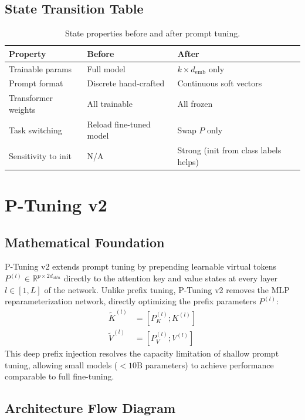 \subsection{State Transition Table}
\begin{table}[h]\centering
\begin{tabular}{lll}\toprule
\textbf{Property} & \textbf{Before} & \textbf{After}\\\midrule
Trainable params & Full model & $k \times d_{\text{emb}}$ only\\
Prompt format & Discrete hand-crafted & Continuous soft vectors\\
Transformer weights & All trainable & All frozen\\
Task switching & Reload fine-tuned model & Swap $P$ only\\
Sensitivity to init & N/A & Strong (init from class labels helps)\\\bottomrule
\end{tabular}
\caption{State properties before and after prompt tuning.}
\end{table}

\newpage
\section{P-Tuning v2}

\subsection{Mathematical Foundation}
P-Tuning v2 extends prompt tuning by prepending learnable virtual tokens $P^{(l)} \in \mathbb{R}^{p \times 2 d_{attn}}$ directly to the attention key and value states at every layer $l \in [1, L]$ of the network. Unlike prefix tuning, P-Tuning v2 removes the MLP reparameterization network, directly optimizing the prefix parameters $P^{(l)}$:
\begin{align}
  \tilde{K}^{(l)} &= [P^{(l)}_K ; K^{(l)}] \\
  \tilde{V}^{(l)} &= [P^{(l)}_V ; V^{(l)}]
\end{align}
This deep prefix injection resolves the capacity limitation of shallow prompt tuning, allowing small models ($<10\text{B}$ parameters) to achieve performance comparable to full fine-tuning.

\subsection{Architecture Flow Diagram}


